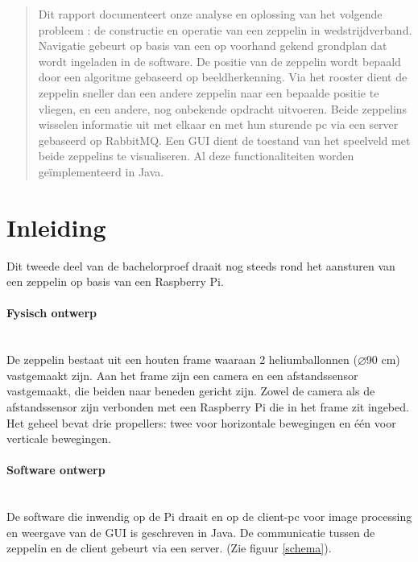 \documentclass[tt]{penoverslag}
\begin{document}
\maketitlepage


\begin{abstract}
\noindent
Dit rapport documenteert onze analyse en oplossing van het volgende probleem : de constructie en operatie van een zeppelin in wedstrijdverband. Navigatie gebeurt op basis van een op voorhand gekend grondplan dat wordt ingeladen in de software. De positie van de zeppelin wordt bepaald door een algoritme gebaseerd op beeldherkenning. Via het rooster dient de zeppelin sneller dan een andere zeppelin naar een bepaalde positie te vliegen, en een andere, nog onbekende opdracht uitvoeren. Beide zeppelins wisselen informatie uit met elkaar en met hun sturende pc via een server gebaseerd op RabbitMQ. Een GUI dient de toestand van het speelveld met beide zeppelins te visualiseren. Al deze functionaliteiten worden ge\"{i}mplementeerd in Java.
\end{abstract}


\tableofcontents\newpage


\section{Inleiding}
Dit tweede deel van de bachelorproef draait nog steeds rond het aansturen van een zeppelin op basis van een Raspberry Pi. 

\paragraph{Fysisch ontwerp}
~\\
De zeppelin bestaat uit een houten frame waaraan 2 heliumballonnen ($\diameter$90 cm) vastgemaakt zijn. Aan het frame zijn een camera en een afstandssensor vastgemaakt, die beiden naar beneden gericht zijn. Zowel de camera als de afstandssensor zijn verbonden met een Raspberry Pi die in het frame zit ingebed. Het geheel bevat drie propellers: twee voor horizontale bewegingen en \'{e}\'{e}n voor verticale bewegingen.


\paragraph{Software ontwerp}
~\\
De software die inwendig op de Pi draait en op de client-pc voor image processing en weergave van de GUI is geschreven in Java. De communicatie tussen de zeppelin en de client gebeurt via een server. (Zie figuur \ref{schema}). \\
\end{document}
